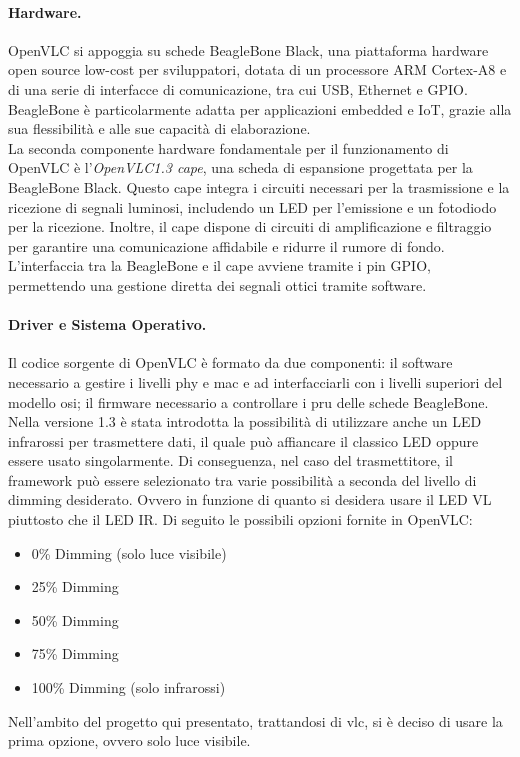 \paragraph{Hardware.}
OpenVLC si appoggia su schede BeagleBone Black, una piattaforma hardware open source low-cost per sviluppatori, dotata di un processore ARM Cortex-A8 e di una serie di interfacce di comunicazione, tra cui USB, Ethernet e GPIO. BeagleBone è particolarmente adatta per applicazioni embedded e IoT, grazie alla sua flessibilità e alle sue capacità di elaborazione.\\
La seconda componente hardware fondamentale per il funzionamento di OpenVLC è l'\textit{OpenVLC1.3 cape}, una scheda di espansione progettata per la BeagleBone Black. Questo cape integra i circuiti necessari per la trasmissione e la ricezione di segnali luminosi, includendo un LED per l'emissione e un fotodiodo per la ricezione. Inoltre, il cape dispone di circuiti di amplificazione e filtraggio per garantire una comunicazione affidabile e ridurre il rumore di fondo. L'interfaccia tra la BeagleBone e il cape avviene tramite i pin GPIO, permettendo una gestione diretta dei segnali ottici tramite software.

\paragraph{Driver e Sistema Operativo.}
Il codice sorgente di OpenVLC è formato da due componenti: il software necessario a gestire i livelli \gls{phy} e \gls{mac} e ad interfacciarli con i livelli superiori del modello \gls{osi}; il firmware necessario a controllare i \gls{pru} delle schede BeagleBone.\\
Nella versione 1.3 è stata introdotta la possibilità di utilizzare anche un LED infrarossi per trasmettere dati, il quale può affiancare il classico LED oppure essere usato singolarmente.
Di conseguenza, nel caso del trasmettitore, il framework può essere selezionato tra varie possibilità a seconda del livello di dimming desiderato. Ovvero in funzione di quanto si desidera usare il LED VL piuttosto che il LED IR.
Di seguito le possibili opzioni fornite in OpenVLC:
\begin{itemize}
    \item 0\% Dimming (solo luce visibile)
    \item 25\% Dimming
    \item 50\% Dimming
    \item 75\% Dimming
    \item 100\% Dimming (solo infrarossi)
\end{itemize}
Nell'ambito del progetto qui presentato, trattandosi di \gls{vlc}, si è deciso di usare la prima opzione, ovvero solo luce visibile.

